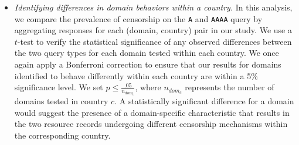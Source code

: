 \begin{itemize}
  \item {\it Identifying differences in domain behaviors within a country.} In
    this analysis, we compare the prevalence of censorship on the {\tt A} and
    {\tt AAAA} query by aggregating responses {for each (domain, country)
    pair in our study}.
    We use a $t$-test to verify the statistical significance of any observed
    differences between the two query types for each domain tested within each
    country. We once again apply a Bonferroni correction to ensure that our
    results for domains identified to behave differently within each country
    are within a 5\% significance level. We set $p \leq
    \frac{.05}{n_{dom_{c}}}$, where $n_{dom_{c}}$ represents the number of
    domains tested in country $c$.
    A statistically significant difference for a domain would suggest
    the presence of a domain-specific characteristic that results in the two
    resource records undergoing different censorship mechanisms within the
    corresponding country.
\end{itemize}


